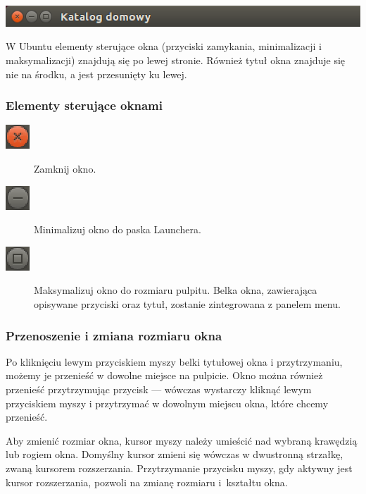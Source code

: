 \begin{center}
	\includegraphics[width=\linewidth]{images/unity_okno_belka.png}
\end{center}

W Ubuntu elementy sterujące okna (przyciski zamykania, minimalizacji i maksymalizacji) znajdują się po lewej stronie. Również tytuł okna znajduje się nie na środku, a jest przesunięty ku lewej.

\subsubsection{Elementy sterujące oknami}
\begin{description}
\item[\includegraphics{images/unity_okno_exit.png}] Zamknij okno.
\item[\includegraphics{images/unity_okno_min.png}] Minimalizuj okno do paska Launchera.
\item[\includegraphics{images/unity_okno_max.png}] Maksymalizuj okno do rozmiaru pulpitu. Belka okna, zawierająca opisywane przyciski oraz tytuł, zostanie zintegrowana z panelem menu.
\end{description}

\subsubsection{Przenoszenie i zmiana rozmiaru okna}
Po kliknięciu lewym przyciskiem myszy belki tytułowej okna i przytrzymaniu, możemy je przenieść w dowolne miejsce na pulpicie. Okno można również przenieść przytrzymując przycisk  --- wówczas wystarczy kliknąć lewym przyciskiem myszy i przytrzymać w dowolnym miejscu okna, które chcemy przenieść.

Aby zmienić rozmiar okna, kursor myszy należy umieścić nad wybraną krawędzią lub rogiem okna. Domyślny kursor zmieni się wówczas w dwustronną strzałkę, zwaną kursorem rozszerzania. Przytrzymanie przycisku myszy, gdy aktywny jest kursor rozszerzania, pozwoli na zmianę rozmiaru i~kształtu okna.

